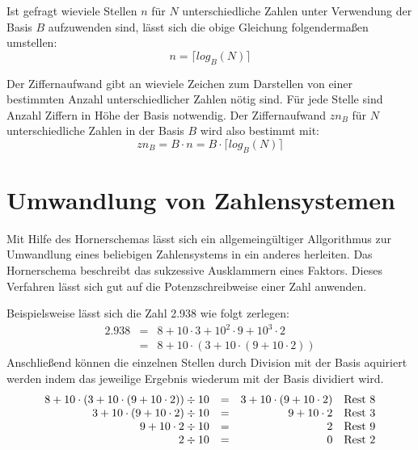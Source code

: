 \documentclass[11pt,a4paper]{scrreprt}
\begin{document}
Ist gefragt wieviele Stellen $n$ für $N$ unterschiedliche Zahlen unter Verwendung der Basis $B$ aufzuwenden sind, lässt sich die obige Gleichung folgendermaßen umstellen:
$$
	n = \lceil log_B(N) \rceil
$$

Der Ziffernaufwand gibt an wieviele Zeichen zum Darstellen von einer bestimmten Anzahl unterschiedlicher Zahlen nötig sind. Für jede Stelle sind Anzahl Ziffern in Höhe der Basis notwendig. Der Ziffernaufwand $zn_B$ für $N$ unterschiedliche Zahlen in der Basis $B$ wird also bestimmt mit:
$$
	zn_B = B \cdot n = B \cdot \lceil log_B(N) \rceil
$$




\section{Umwandlung von Zahlensystemen}
Mit Hilfe des Hornerschemas lässt sich ein allgemeingültiger Allgorithmus zur Umwandlung eines beliebigen Zahlensystems in ein anderes herleiten. Das Hornerschema beschreibt das sukzessive Ausklammern eines Faktors. Dieses Verfahren lässt sich gut auf die Potenzschreibweise einer Zahl anwenden.

Beispielsweise lässt sich die Zahl 2.938 wie folgt zerlegen:
\begin{eqnarray*}
	2.938 & = & 8 + 10 \cdot 3 + 10^2 \cdot 9 + 10^3 \cdot 2 \\
	& = & 8 + 10 \cdot (3 + 10 \cdot(9 + 10 \cdot 2))
\end{eqnarray*}
Anschließend können die einzelnen Stellen durch Division mit der Basis aquiriert werden indem das jeweilige Ergebnis wiederum mit der Basis dividiert wird.
$$
\begin{array}{rrrl}
  8 + 10 \cdot (3 + 10 \cdot(9 + 10 \cdot 2)) \div 10 & = & 3 + 10 \cdot(9 + 10 \cdot 2)  & \textnormal{Rest } 8 \\
  3 + 10 \cdot(9 + 10 \cdot 2) \div 10 & = & 9 + 10 \cdot 2  & \textnormal{Rest } 3 \\
  9 + 10 \cdot 2 \div 10 & = & 2  & \textnormal{Rest } 9 \\
  2 \div 10 & = & 0  & \textnormal{Rest } 2 \\
\end{array}
$$
\end{document}
